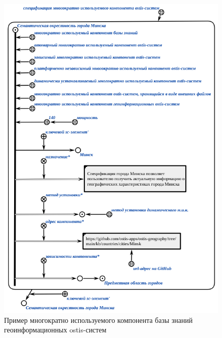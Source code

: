 \begin{figure}[H]
\includegraphics[scale=0.8]{author/part7/figures/gis_kb_component.png}
\caption{Пример многократно используемого компонента базы знаний геоинформационных ostis-систем}
\label{fig:gis_kb_component}
\end{figure}


